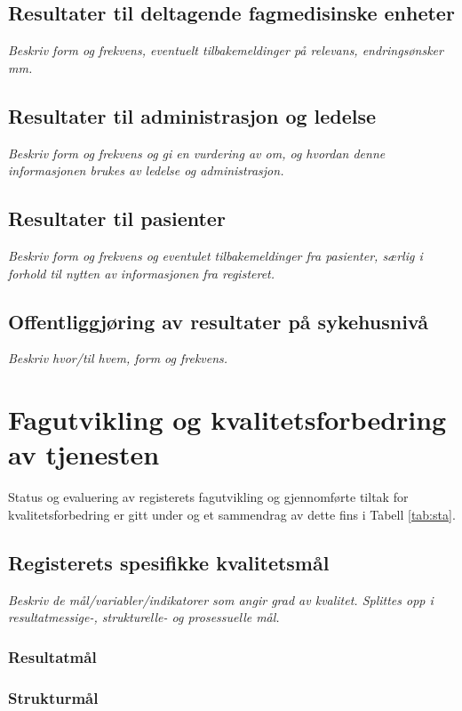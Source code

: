 \documentclass[norsk, a4paper, twocolumn]{report}
\begin{document}
\section{Resultater til deltagende fagmedisinske enheter}\label{sec:resfag}
\textit{Beskriv form og frekvens,  eventuelt tilbakemeldinger på relevans,
endringsønsker mm.}

\section{Resultater til administrasjon og ledelse}\label{sec:resled}
\textit{Beskriv form og frekvens og gi en vurdering av om, og hvordan denne
informasjonen brukes av ledelse og administrasjon.}

\section{Resultater til pasienter}\label{sec:respas}
\textit{Beskriv form og frekvens og eventulet tilbakemeldinger fra pasienter,
særlig i forhold til nytten av informasjonen fra registeret.}

\section{Offentliggjøring av resultater på sykehusnivå}\label{sec:off}
\textit{Beskriv hvor/til hvem, form og frekvens.}




\chapter{Fagutvikling og kvalitetsforbedring av tjenesten}\label{cha:fag}
Status og evaluering av registerets fagutvikling og gjennomførte tiltak for
kvalitetsforbedring er gitt under og et sammendrag av dette fins i Tabell
\ref{tab:sta}.
\section{Registerets spesifikke kvalitetsmål}\label{sec:regspe}
\textit{Beskriv de mål/variabler/indikatorer som angir grad av kvalitet.
Splittes opp i resultatmessige-, strukturelle- og prosessuelle mål.}

\subsection{Resultatmål}

\subsection{Strukturmål}
\end{document}
